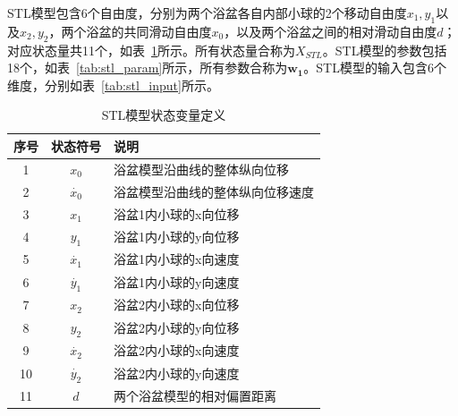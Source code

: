             STL模型包含6个自由度，分别为两个浴盆各自内部小球的2个移动自由度$x_1,y_1$以及$x_2,y_2$，两个浴盆的共同滑动自由度$x_0$，以及两个浴盆之间的相对滑动自由度$d$；对应状态量共11个，如表~\ref{tab:stl_state}所示。所有状态量合称为$X_{STL}$。STL模型的参数包括18个，如表~\ref{tab:stl_param}所示，所有参数合称为$\boldsymbol{w_1}$。STL模型的输入包含6个维度，分别如表~\ref{tab:stl_input}所示。


            \begin{table}[h]
            \centering
            \caption{STL模型状态变量定义}
            \label{tab:stl_state}
            \begin{tabular}{ccl}
            \toprule
            序号 & 状态符号 & 说明 \\
            \midrule
            1 & $x_0$ & 浴盆模型沿曲线的整体纵向位移 \\
            2 & $\dot{x_0}$ & 浴盆模型沿曲线的整体纵向位移速度 \\
            3 & $x_1$ & 浴盆1内小球的x向位移 \\
            4 & $y_1$ & 浴盆1内小球的y向位移 \\
            5 & $\dot{x_1}$ & 浴盆1内小球的x向速度 \\
            6 & $\dot{y_1}$ & 浴盆1内小球的y向速度 \\
            7 & $x_2$ & 浴盆2内小球的x向位移 \\
            8 & $y_2$ & 浴盆2内小球的y向位移 \\
            9 & $\dot{x_2}$ & 浴盆2内小球的x向速度 \\
            10 & $\dot{y_2}$ & 浴盆2内小球的y向速度 \\
            11 & $d$ & 两个浴盆模型的相对偏置距离 \\
            \bottomrule
            \end{tabular}
            \end{table}

